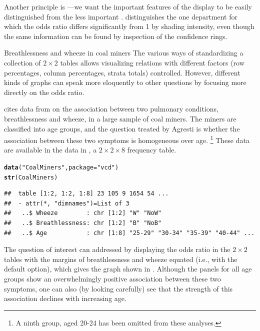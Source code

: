\documentclass[11pt]{book}\usepackage[]{graphicx}\usepackage[]{color}
\makeatletter
\newcommand{\hlstr}[1]{\textcolor[rgb]{0.192,0.494,0.8}{#1}}%
\newcommand{\hlstd}[1]{\textcolor[rgb]{0.345,0.345,0.345}{#1}}%
\newcommand{\hlkwc}[1]{\textcolor[rgb]{0.333,0.667,0.333}{#1}}%
\newcommand{\hlkwd}[1]{\textcolor[rgb]{0.737,0.353,0.396}{\textbf{#1}}}%
\newenvironment{kframe}{%
 \def\at@end@of@kframe{}%
 \ifinner\ifhmode%
  \def\at@end@of@kframe{\end{minipage}}%
  \begin{minipage}{\columnwidth}%
 \fi\fi%
 \def\FrameCommand##1{\hskip\@totalleftmargin \hskip-\fboxsep
 \colorbox{shadecolor}{##1}\hskip-\fboxsep
     \hskip-\linewidth \hskip-\@totalleftmargin \hskip\columnwidth}%
 \MakeFramed {\advance\hsize-\width
   \@totalleftmargin\z@ \linewidth\hsize
   \@setminipage}}%
 {\par\unskip\endMakeFramed%
 \at@end@of@kframe}
\newenvironment{knitrout}{}{} %
\renewenvironment{knitrout}{\small\renewcommand{\baselinestretch}{.85}}{} %
\makeatother
\begin{document}
Another principle is ---we want the important
features
of the display to be easily distinguished from the less important
\citep{Tukey:93}.
 distinguishes the one department for which
the odds ratio differs significantly from 1 by shading intensity,
even though the same information can be found by inspection of the
confidence rings.

\begin{Example}[wheeze1]{Breathlessness and wheeze in coal miners}
The various ways of standardizing a collection of $2 \times 2$ tables
allows visualizing relations with different factors
(row percentages, column percentages, strata totals) controlled.
However, different kinds of graphs can speak more eloquently to other questions by focusing more directly on the odds ratio.

\citet[Table 7.11]{Agresti:90} cites data from
\citet{AshfordSnowden:70} on the association between
two pulmonary conditions, breathlessness and wheeze, in a large sample of coal miners.
The miners are classified into age groups, and the question treated
by Agresti is whether the association between these two symptoms
is homogeneous over age.%
\footnote{A ninth group, aged 20-24 has been omitted from these
analyses.}
These data are available in the  data in
, a $2 \times 2 \times 8$ frequency table.
\begin{knitrout}
\color{fgcolor}\begin{kframe}
\begin{alltt}
\hlkwd{data}\hlstd{(}\hlstr{"CoalMiners"}\hlstd{,} \hlkwc{package}\hlstd{=}\hlstr{"vcd"}\hlstd{)}
\hlkwd{str}\hlstd{(CoalMiners)}
\end{alltt}
\begin{verbatim}
##  table [1:2, 1:2, 1:8] 23 105 9 1654 54 ...
##  - attr(*, "dimnames")=List of 3
##   ..$ Wheeze        : chr [1:2] "W" "NoW"
##   ..$ Breathlessness: chr [1:2] "B" "NoB"
##   ..$ Age           : chr [1:8] "25-29" "30-34" "35-39" "40-44" ...
\end{verbatim}
\end{kframe}
\end{knitrout}


The question of interest
can addressed by displaying the odds ratio
in the $2 \times 2$ tables with the margins of breathlessness
and wheeze equated (i.e., with the default  option),
which gives the graph shown in .
Although the panels for all age groups show an overwhelmingly
positive association between these two symptoms, one can also
(by looking carefully)
see that the strength of this association declines with increasing
age.


\end{Example}
\end{document}
